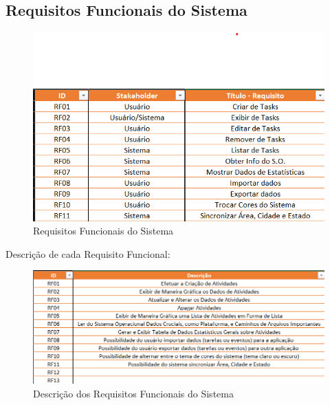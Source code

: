 \documentclass[a4paper,12pt]{article}
\begin{document}
\subsection{Requisitos Funcionais do Sistema}
\begin{figure}[H]
	\centering
	\includegraphics[scale=0.80]{requirements/functionals/requirements.png}
	\caption{Requisitos Funcionais do Sistema}
\end{figure}
Descrição de cada Requisito Funcional:
\begin{figure}[H]
	\centering
	\includegraphics[scale=0.80]{requirements/functionals/description.png}
	\caption{Descrição dos Requisitos Funcionais do Sistema}
\end{figure}
\end{document}
